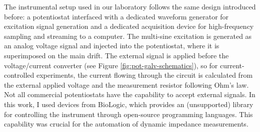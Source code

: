 


The instrumental setup used in our laboratory follows the same design introduced before: a potentiostat interfaced with a dedicated waveform generator for excitation signal generation and a dedicated acquisition device for high-frequency sampling and streaming to a computer.
The multi-sine excitation is generated as an analog voltage signal and injected into the potentiostat, where it is superimposed on the main drift.
The external signal is applied before the voltage/current converter (see Figure \ref{fig:pot-galv-schematics}), so for current-controlled experiments, the current flowing through the circuit is calculated from the external applied voltage and the measurement resistor following Ohm's law.
Not all commercial potentiostats have the capability to accept external signals.
In this work, I used devices from BioLogic, which provides an (unsupported) library for controlling the instrument through open-source programming languages.
This capability was crucial for the automation of dynamic impedance measurements.

